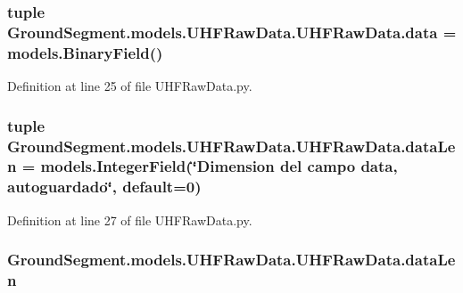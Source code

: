 \subsubsection[{data}]{\setlength{\rightskip}{0pt plus 5cm}tuple Ground\+Segment.\+models.\+U\+H\+F\+Raw\+Data.\+U\+H\+F\+Raw\+Data.\+data = models.\+Binary\+Field()\hspace{0.3cm}{\ttfamily [static]}}\label{class_ground_segment_1_1models_1_1_u_h_f_raw_data_1_1_u_h_f_raw_data_a617ee1b3a10bfb1dbdad7f5e58ecd111}


Definition at line 25 of file U\+H\+F\+Raw\+Data.\+py.

\hypertarget{class_ground_segment_1_1models_1_1_u_h_f_raw_data_1_1_u_h_f_raw_data_a61b9ad50a4b98a17adcf65d05fe213c5}{}
\subsubsection[{data\+Len}]{\setlength{\rightskip}{0pt plus 5cm}tuple Ground\+Segment.\+models.\+U\+H\+F\+Raw\+Data.\+U\+H\+F\+Raw\+Data.\+data\+Len = models.\+Integer\+Field(\char`\"{}Dimension del campo {\bf data}, autoguardado\char`\"{}, default=0)\hspace{0.3cm}{\ttfamily [static]}}\label{class_ground_segment_1_1models_1_1_u_h_f_raw_data_1_1_u_h_f_raw_data_a61b9ad50a4b98a17adcf65d05fe213c5}


Definition at line 27 of file U\+H\+F\+Raw\+Data.\+py.

\hypertarget{class_ground_segment_1_1models_1_1_u_h_f_raw_data_1_1_u_h_f_raw_data_aff0c88499e748d48a0cd7faaf99a0a83}{}
\subsubsection[{data\+Len}]{\setlength{\rightskip}{0pt plus 5cm}Ground\+Segment.\+models.\+U\+H\+F\+Raw\+Data.\+U\+H\+F\+Raw\+Data.\+data\+Len}\label{class_ground_segment_1_1models_1_1_u_h_f_raw_data_1_1_u_h_f_raw_data_aff0c88499e748d48a0cd7faaf99a0a83}


